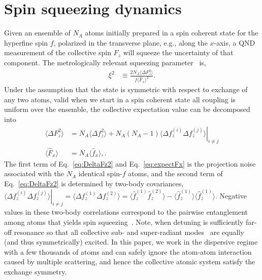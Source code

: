 \documentclass[preprint,aps,pra,onecolumn,superscriptaddress]{revtex4-1} %
\newcommand{\expect}[1]{\big\langle #1 \big\rangle}
\begin{document}
\section{Spin squeezing dynamics}

Given an ensemble of $N_A$ atoms initially prepared in a spin coherent state for the hyperfine spin $f$, polarized in the transverse plane, e.g., along the $x$-axis, a QND measurement of the collective spin  $F_z$ will squeeze the uncertainty of that component.  The metrologically relevant squeezing parameter~\cite{Wineland1992} is,
\begin{align}\label{eq:xi2Faraday}
\xi^2 &\equiv  \frac{2 N_A\expect{\Delta F_z ^2}}{f\expect{\hat{F}_x}^2}.
\end{align}
Under the assumption that the state is symmetric with respect to exchange of any two atoms, valid when we start in a spin coherent state all coupling is uniform over the ensemble, the collective expectation value can be decomposed into 
\begin{subequations}\label{eq:Ftof_squeezing}
\begin{align}
\expect{\Delta F_z^2} &= N_A \expect{\Delta f_z^2}+N_A(N_A-1)\left. \expect{\Delta f_z^{(i)}\Delta f_z^{(j)}}\right|_{i\neq j}\label{eq:DeltaFz2}\\
\expect{\hat{F}_x } & =N_A \expect{\hat{f}_x},\label{eq:expectFx}.
\end{align}
\end{subequations}
 The first term of Eq.~\eqref{eq:DeltaFz2} and Eq.~\eqref{eq:expectFx} is the projection noise associated with the  $N_A$ identical spin-$f$  atoms, and  the second term of Eq.~\eqref{eq:DeltaFz2} is determined by two-body covariances, $ \left.\expect{\Delta f_z^{(i)}\Delta f_z^{(j)}}\right|_{i\neq j}=\expect{\Delta f_z^{(1)}\Delta f_z^{(2)}} = \expect{\hat{f}_z^{(1)}\hat{f}_z^{(2)}}-\expect{\hat{f}_z^{(1)}} \expect{\hat{f}_z^{(1)}} $.  Negative values in these two-body correlations correspond to the pairwise entanglement among atoms that yields spin squeezing~\cite{Wang2003Spin}.  Note, when detuning is sufficiently far-off resonance so that all collective sub- and super-radiant modes~\cite{Asenjo-Garcia2017Atom,Asenjo-Garcia2017Exponential} are equally (and thus symmetrically) excited.  In this paper, we work in the dispersive regime with a few thousands of atoms and can safely ignore the atom-atom interaction caused by multiple scattering, and hence the collective atomic system satisfy the exchange symmetry. 
\end{document}

